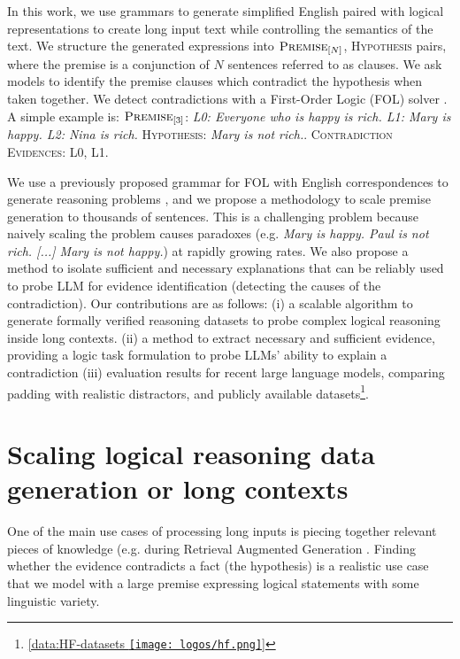 \documentclass[11pt]{article}
\newlength{\myMheight}
\newcommand{\hf}{\texttt{[image: logos/hf.png]}}
\begin{document}
In this work, we use grammars to generate simplified English paired with logical representations to create long input text while controlling the semantics of the text. We structure the generated expressions into $\textsc{Premise}_{[N]}$, \textsc{Hypothesis} pairs, where the premise is a conjunction of $N$ sentences referred to as clauses. We ask models to identify the premise clauses which contradict the hypothesis when taken together. We detect contradictions with a First-Order Logic (FOL) solver \cite{goodwin-etal-2020-probing}. A simple example is:
$\textsc{Premise}_{[3]}$: \textit{L0: Everyone who is happy is rich. L1: Mary is happy. L2: Nina is rich.} \textsc{Hypothesis}: \textit{Mary is not rich.}. \textsc{Contradiction Evidences}: L0, L1.


We use a previously proposed grammar for FOL with English correspondences to generate reasoning problems \cite{sileo2024scaling}, and we propose a methodology to scale premise generation to thousands of sentences. This is a challenging problem because naively scaling the problem causes paradoxes (e.g. \textit{Mary is happy. Paul is not rich. [...] Mary is not happy.}) at rapidly growing rates.
We also propose a method to isolate sufficient and necessary explanations that can be reliably used to probe LLM for evidence identification (detecting the causes of the contradiction).
Our contributions are as follows: (i) a scalable algorithm to generate formally verified reasoning datasets to probe complex logical reasoning inside long contexts. (ii) a method to extract necessary and sufficient evidence, providing a logic task formulation to probe LLMs' ability to explain a contradiction (iii) evaluation results for recent large language models, comparing padding with realistic distractors, and publicly available datasets\footnote{\href{https://hf.co/datasets/sileod/LogicHaystacks}{[data:HF-datasets \hf]}\label{footnote:urls}}.




\section{Scaling logical reasoning data generation or long contexts}

One of the main use cases of processing long inputs is piecing together relevant pieces of knowledge (e.g. during Retrieval Augmented Generation \cite{lewis2020retrieval}. Finding whether the evidence contradicts a fact (the hypothesis) is a realistic use case that we model with a large premise expressing logical statements with some linguistic variety.
\end{document}
